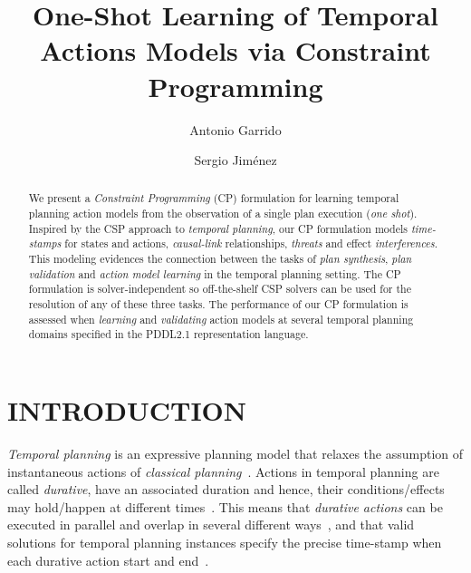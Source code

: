 \documentclass{ecai}
\begin{document}
\title{One-Shot Learning of Temporal Actions Models via Constraint Programming}
\author{Antonio Garrido \and Sergio Jim\'enez}
 
 
\maketitle

\begin{abstract}
  We present a {\em Constraint Programming} (CP) formulation for learning temporal planning  action models from the observation of a single plan execution ({\em one shot}). Inspired by the CSP approach to {\em temporal planning}, our CP formulation models {\em time-stamps} for states and actions, {\em causal-link} relationships, {\em threats} and effect {\em interferences}. This modeling evidences the connection between the tasks of {\em plan synthesis}, {\em plan validation} and {\em action model learning} in the temporal planning setting. The CP formulation is solver-independent so off-the-shelf CSP solvers can be used for the resolution of any of these three tasks. The performance of our CP formulation is assessed when {\em learning} and {\em validating} action models at several temporal planning domains specified in the PDDL2.1 representation language. 
\end{abstract}



\section{INTRODUCTION}

{\em Temporal planning} is an expressive planning model that relaxes the assumption of instantaneous actions of {\em classical planning}~\cite{geffner2013concise}. Actions in temporal planning are called {\em durative}, have an associated duration and hence, their conditions/effects may hold/happen at different times~\cite{fox2003pddl2}. This means that {\em durative actions} can be executed in parallel and overlap in several different ways~\cite{cushing2007temporal}, and that valid solutions for temporal planning instances specify the precise time-stamp when each durative action start and end~\cite{howey2004val}.
\end{document}
